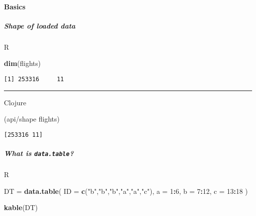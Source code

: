\documentclass[]{article}
\newenvironment{Shaded}{\begin{snugshade}}{\end{snugshade}}
\newcommand{\DataTypeTok}[1]{\textcolor[rgb]{0.13,0.29,0.53}{#1}}
\newcommand{\DecValTok}[1]{\textcolor[rgb]{0.00,0.00,0.81}{#1}}
\newcommand{\KeywordTok}[1]{\textcolor[rgb]{0.13,0.29,0.53}{\textbf{#1}}}
\newcommand{\NormalTok}[1]{#1}
\newcommand{\OperatorTok}[1]{\textcolor[rgb]{0.81,0.36,0.00}{\textbf{#1}}}
\newcommand{\StringTok}[1]{\textcolor[rgb]{0.31,0.60,0.02}{#1}}
\let\oldparagraph\paragraph
\renewcommand{\paragraph}[1]{\oldparagraph{#1}\mbox{}}
\let\oldsubparagraph\subparagraph
\renewcommand{\subparagraph}[1]{\oldsubparagraph{#1}\mbox{}}
\begin{document}
\hypertarget{basics}{%
\paragraph{Basics}\label{basics}}

\hypertarget{shape-of-loaded-data}{%
\subparagraph{Shape of loaded data}\label{shape-of-loaded-data}}

R

\begin{Shaded}
\begin{Highlighting}[]
\KeywordTok{dim}\NormalTok{(flights)}
\end{Highlighting}
\end{Shaded}

\begin{verbatim}
[1] 253316     11
\end{verbatim}

\begin{center}\rule{0.5\linewidth}{0.5pt}\end{center}

Clojure

\begin{Shaded}
\begin{Highlighting}[]
\NormalTok{(api/shape flights)}
\end{Highlighting}
\end{Shaded}

\begin{verbatim}
[253316 11]
\end{verbatim}

\hypertarget{what-is-data.table}{%
\subparagraph{\texorpdfstring{What is
\texttt{data.table}?}{What is data.table?}}\label{what-is-data.table}}

R

\begin{Shaded}
\begin{Highlighting}[]
\NormalTok{DT =}\StringTok{ }\KeywordTok{data.table}\NormalTok{(}
  \DataTypeTok{ID =} \KeywordTok{c}\NormalTok{(}\StringTok{"b"}\NormalTok{,}\StringTok{"b"}\NormalTok{,}\StringTok{"b"}\NormalTok{,}\StringTok{"a"}\NormalTok{,}\StringTok{"a"}\NormalTok{,}\StringTok{"c"}\NormalTok{),}
  \DataTypeTok{a =} \DecValTok{1}\OperatorTok{:}\DecValTok{6}\NormalTok{,}
  \DataTypeTok{b =} \DecValTok{7}\OperatorTok{:}\DecValTok{12}\NormalTok{,}
  \DataTypeTok{c =} \DecValTok{13}\OperatorTok{:}\DecValTok{18}
\NormalTok{)}

\KeywordTok{kable}\NormalTok{(DT)}
\end{Highlighting}
\end{Shaded}
\end{document}
